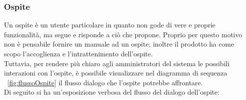 \subsubsection{Ospite}
Un ospite è un utente particolare in quanto non gode di vere e proprie funzionalità, ma segue e risponde a ciò che \PROGETTO{} propone. Proprio per questo motivo non è pensabile fornire un manuale ad un ospite; inoltre il prodotto ha come scopo l'accoglienza e l'intrattenimento dell'ospite.\\
Tuttavia, per rendere più chiaro agli amministratori del sistema le possibili interazioni con l'ospite, è possibile visualizzare nel diagramma di sequenza ~\ref{fig:flussoOspite} il flusso dialogo che l'ospite potrebbe affrontare.\\
Di seguito si ha un'esposizione verbosa del flusso del dialogo dell'ospite:
